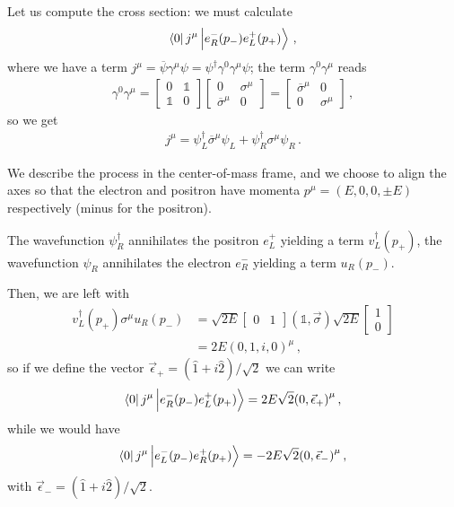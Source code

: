 \documentclass[main.tex]{subfiles}
\begin{document}
Let us compute the cross section: we must calculate  
%
\begin{align}
\bra{0} j^{\mu } \ket{e^{-}_{R} (p_{-}) e^{+}_{L} (p_+)} 
\,,
\end{align}
%
where we have a term \(j^{\mu } = \overline{\psi} \gamma^{\mu } \psi = \psi ^\dag \gamma^{0} \gamma^{\mu } \psi \); the term \(\gamma^{0} \gamma^{\mu }\) reads 
%
\begin{align}
\gamma^{0} \gamma^{\mu } = \left[\begin{array}{cc}
0 & \mathbb{1} \\ 
\mathbb{1} & 0
\end{array}\right]
\left[\begin{array}{cc}
0 & \sigma^{\mu } \\ 
\overline{\sigma}^{\mu } & 0
\end{array}\right] 
= \left[\begin{array}{cc}
\overline{\sigma}^{\mu } & 0 \\ 
0 & \sigma^{\mu }
\end{array}\right]
\,,
\end{align}
%
so we get 
%
\begin{align}
j^{\mu } = \psi_{L} ^\dag \overline{\sigma}^{\mu } \psi_{L} + \psi_{R} ^\dag \sigma^{\mu } \psi_{R}
\,.
\end{align}

We describe the process in the center-of-mass frame, and we choose to align the axes so that the electron and positron have momenta \(p^{\mu } = (E, 0, 0, \pm E)\) respectively (minus for the positron).

The wavefunction \(\psi ^\dag_{R}\) annihilates the positron \(e^{+}_{L}\) yielding a term \(v ^\dag _L (p_+)\), the wavefunction \(\psi_{R}\) annihilates the electron \(e^{-}_{R}\) yielding a term \(u_R (p_-)\). 

Then, we are left with  
%
\begin{align}
v_L ^\dag (p_+) \sigma^{\mu } u_R (p_-) &= \sqrt{2E} 
\left[\begin{array}{cc}
0 & 1
\end{array}\right]
(\mathbb{1}, \vec{\sigma}) \sqrt{2E}
\left[\begin{array}{c}
1 \\ 
0
\end{array}\right]  \\
&= 2E (0, 1, i, 0)^{\mu }
\,,
\end{align}
%
so if we define the vector \(\vec{\epsilon}_{+} = (\hat{1} + i \hat{2}) / \sqrt{2}\) we can write 
%
\begin{align}
\bra{0}
j^{\mu } 
\ket{e^{-}_R (p_-) e^{+}_L (p_+)}
= 2 E \sqrt{2} \qty(0, \vec{\epsilon}_{+})^{\mu }
\,,
\end{align}
%
while we would have 
%
\begin{align}
\bra{0}
j^{\mu } 
\ket{e^{-}_L (p_-) e^{+}_R (p_+)}
= - 2 E \sqrt{2} \qty(0, \vec{\epsilon}_{-})^{\mu }
\,,
\end{align}
%
with \(\vec{\epsilon}_{-} =(\hat{1} + i \hat{2}) / \sqrt{2} \). 
\end{document}
